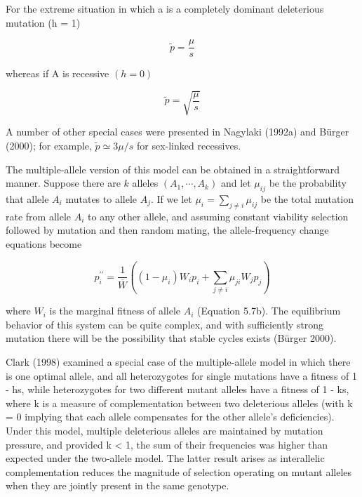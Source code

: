 \documentclass{article}
\begin{document}
For the extreme situation in which a is a completely dominant deleterious mutation (h = 1)

\begin{equation}
\widetilde{p}=\frac{\mu}{s}
\tag{7.6c}
\label{eq:7_6c}
\end{equation}

whereas if A is recessive  $ (h = 0) $

\begin{equation}
\widetilde{p}=\sqrt{\frac{\mu}{s}}
\tag{7.6d}
\label{eq:7_6d}
\end{equation}

A number of other special cases were presented in Nagylaki (1992a) and Bürger (2000); for example,  $ \widetilde{p} \simeq 3\mu/s $ for sex-linked recessives.

The multiple-allele version of this model can be obtained in a straightforward manner. Suppose there are  $ k $ alleles  $ (A_1, \cdots, A_k) $ and let  $ \mu_{ij} $ be the probability that allele  $ A_i $ mutates to allele  $ A_j $. If we let  $ \mu_i = \sum_{j \neq i} \mu_{ij} $ be the total mutation rate from allele  $ A_i $ to any other allele, and assuming constant viability selection followed by mutation and then random mating, the allele-frequency change equations become

\begin{equation}
p_{i}^{\prime\prime}=\frac{1}{\overline{W}}\left(\left(1-\mu_{i}\right)W_{i}p_{i}+\sum_{j\neq i}\mu_{j i}W_{j}p_{j}\right)
\tag{7.7}
\label{eq:7_7}
\end{equation}

where  $ W_{i} $ is the marginal fitness of allele  $ A_{i} $ (Equation 5.7b). The equilibrium behavior of this system can be quite complex, and with sufficiently strong mutation there will be the possibility that stable cycles exists (Bürger 2000).

Clark (1998) examined a special case of the multiple-allele model in which there is one optimal allele, and all heterozygotes for single mutations have a fitness of 1 - hs, while heterozygotes for two different mutant alleles have a fitness of 1 - ks, where k is a measure of complementation between two deleterious alleles (with k = 0 implying that each allele compensates for the other allele's deficiencies). Under this model, multiple deleterious alleles are maintained by mutation pressure, and provided k < 1, the sum of their frequencies was higher than expected under the two-allele model. The latter result arises as interallelic complementation reduces the magnitude of selection operating on mutant alleles when they are jointly present in the same genotype.
\end{document}
